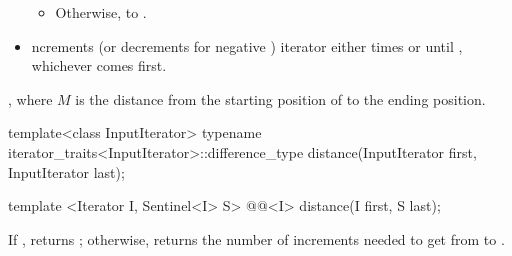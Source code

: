 \begin{addedblock}
\begin{itemdescr}
\begin{itemize}
\begin{itemize}
      \item Otherwise,  to .
      \end{itemize}

\item {}ncrements (or decrements for negative )
      iterator  either  times or until ,
      whichever comes first.
\end{itemize}

\pnum
\returns
{}, where $M$ is the distance from the starting position of
 to the ending position.
\end{itemdescr}
\end{addedblock}

%
\begin{removedblock}
\begin{itemdecl}
  template<class InputIterator>
      typename iterator_traits<InputIterator>::difference_type
         distance(InputIterator first, InputIterator last);
\end{itemdecl}
\end{removedblock}
\begin{addedblock}
\begin{itemdecl}
template <Iterator I, Sentinel<I> S>
  @@<I> distance(I first, S last);
\end{itemdecl}
\end{addedblock}

\begin{itemdescr}
\pnum
{}

\pnum
\effects
If 
\brk{}, returns ; otherwise,
returns the number of increments needed to get from
to
.

\pnum
{}
\end{itemdescr}

